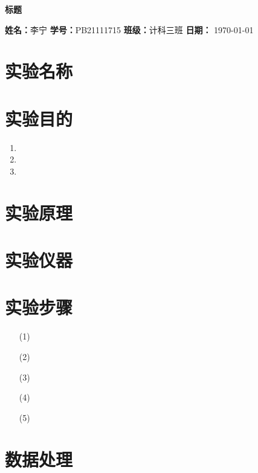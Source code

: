 \documentclass[12pt, a4paper, oneside]{ctexart}
\begin{document}
\begin{center}
    \Large\textbf{标题}
\end{center}

{\centering
    \textbf{姓名：}李宁 \quad 
    \textbf{学号：}PB21111715 \quad 
    \textbf{班级：}计科三班 \quad 
    \textbf{日期：} \today
}

\section{实验名称}

\section{实验目的}
\begin{enumerate}
    \item 
    \item 
    \item 
\end{enumerate}

\section{实验原理}

\section{实验仪器}

\section{实验步骤}
\begin{enumerate}
    \item[(1)] 
    \item[(2)] 
    \item[(3)] 
    \item[(4)] 
    \item[(5)] 
\end{enumerate}

\section{数据处理}

\end{document}

